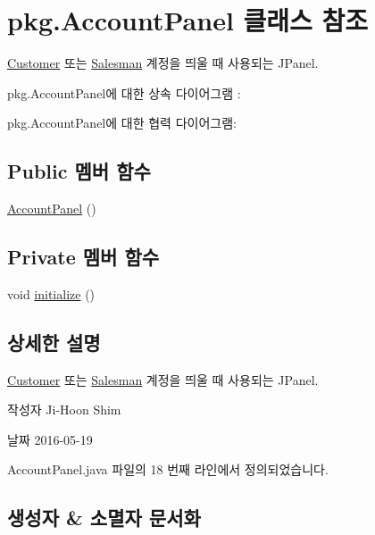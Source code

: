 \hypertarget{classpkg_1_1_account_panel}{}\section{pkg.\+Account\+Panel 클래스 참조}
\label{classpkg_1_1_account_panel}


\hyperlink{classpkg_1_1_customer}{Customer} 또는 \hyperlink{classpkg_1_1_salesman}{Salesman} 계정을 띄울 때 사용되는 J\+Panel.  




pkg.\+Account\+Panel에 대한 상속 다이어그램 \+: 


pkg.\+Account\+Panel에 대한 협력 다이어그램\+:
\subsection*{Public 멤버 함수}
\begin{DoxyCompactItemize}
\item 
\hyperlink{classpkg_1_1_account_panel_a7b9ef25e1bce2b7b8a6dd734e6dc8f9b}{Account\+Panel} ()
\end{DoxyCompactItemize}
\subsection*{Private 멤버 함수}
\begin{DoxyCompactItemize}
\item 
void \hyperlink{classpkg_1_1_account_panel_a271879f011b6924c7835ce2618050e0b}{initialize} ()
\end{DoxyCompactItemize}


\subsection{상세한 설명}
\hyperlink{classpkg_1_1_customer}{Customer} 또는 \hyperlink{classpkg_1_1_salesman}{Salesman} 계정을 띄울 때 사용되는 J\+Panel. 

\begin{DoxyAuthor}{작성자}
Ji-\/\+Hoon Shim 
\end{DoxyAuthor}
\begin{DoxyDate}{날짜}
2016-\/05-\/19 
\end{DoxyDate}


Account\+Panel.\+java 파일의 18 번째 라인에서 정의되었습니다.



\subsection{생성자 \& 소멸자 문서화}
